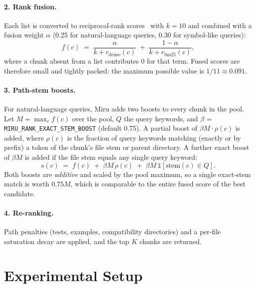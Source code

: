 \documentclass[11pt, letterpaper]{article}
\newcommand{\code}[1]{\texttt{#1}}
\begin{document}
\paragraph{2. Rank fusion.} Each list is converted to reciprocal-rank scores~\cite{cormack2009rrf} with $k{=}10$ and
combined with a fusion weight $\alpha$ (0.25 for natural-language queries, 0.30 for symbol-like queries):
\begin{equation}
  f(c) \;=\; \frac{\alpha}{k + r_{\mathrm{dense}}(c)} \;+\; \frac{1-\alpha}{k + r_{\mathrm{bm25}}(c)},
  \label{eq:fusion}
\end{equation}
where a chunk absent from a list contributes 0 for that term. Fused scores are therefore small and tightly packed:
the maximum possible value is $1/11 \approx 0.091$.

\paragraph{3. Path-stem boosts.} For natural-language queries, Miru adds two boosts to every chunk in the pool.
Let $M = \max_c f(c)$ over the pool, $Q$ the query keywords, and $\beta$ = \code{MIRU\_RANK\_EXACT\_STEM\_BOOST}
(default 0.75). A partial boost of $\beta M \cdot \rho(c)$ is added, where $\rho(c)$ is the fraction of query keywords
matching (exactly or by prefix) a token of the chunk's file stem or parent directory. A further exact boost of
$\beta M$ is added if the file stem equals any single query keyword:
\begin{equation}
  s(c) \;=\; f(c) \;+\; \beta M\,\rho(c) \;+\; \beta M\,\mathbb{1}\!\left[\mathrm{stem}(c)\in Q\right].
  \label{eq:boost}
\end{equation}
Both boosts are \emph{additive} and scaled by the pool maximum, so a single exact-stem match is worth $0.75M$, which is
comparable to the entire fused score of the best candidate.

\paragraph{4. Re-ranking.} Path penalties (tests, examples, compatibility directories) and a per-file saturation
decay are applied, and the top $K$ chunks are returned.

\section{Experimental Setup}\label{sec:setup}
\end{document}
